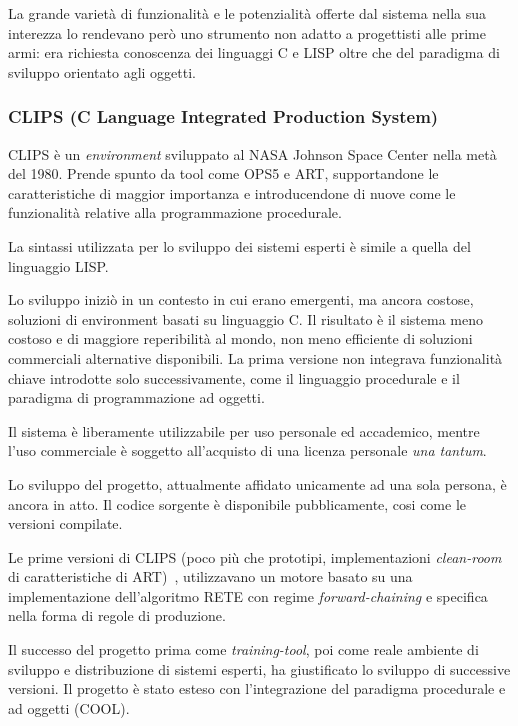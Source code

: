 La grande varietà di funzionalità e le potenzialità offerte dal sistema nella sua interezza lo rendevano però uno strumento non adatto a progettisti alle prime armi: era richiesta conoscenza dei linguaggi C e LISP oltre che del paradigma di sviluppo orientato agli oggetti.~\cite{development1993}

\subsubsection{CLIPS (C Language Integrated Production System)}

CLIPS è un \emph{environment} sviluppato al NASA Johnson Space Center nella metà del 1980. Prende spunto da tool come OPS5 e ART, supportandone le caratteristiche di maggior importanza e introducendone di nuove come le funzionalità relative alla programmazione procedurale. 

La sintassi utilizzata per lo sviluppo dei sistemi esperti è simile a quella del linguaggio LISP. 

Lo sviluppo iniziò in un contesto in cui erano emergenti, ma ancora costose, soluzioni di environment basati su linguaggio C. Il risultato è il sistema meno costoso e di maggiore reperibilità al mondo, non meno efficiente di soluzioni commerciali alternative disponibili. La prima versione non integrava funzionalità chiave introdotte solo successivamente, come il linguaggio procedurale e il paradigma di programmazione ad oggetti.~\cite{jackson1999}

Il sistema è liberamente utilizzabile per uso personale ed accademico, mentre l'uso commerciale è soggetto all'acquisto di una licenza personale \emph{una tantum}.

Lo sviluppo del progetto, attualmente affidato unicamente ad una sola persona, è ancora in atto. Il codice sorgente è disponibile pubblicamente, cosi come le versioni compilate.

Le prime versioni di CLIPS (poco più che prototipi, implementazioni \emph{clean-room} di caratteristiche di ART)~\cite{clipsarch1992}, utilizzavano un motore basato su una implementazione dell'algoritmo RETE con regime \emph{forward-chaining} e specifica nella forma di regole di produzione. 

Il successo del progetto prima come \emph{training-tool}, poi come reale ambiente di sviluppo e distribuzione di sistemi esperti, ha giustificato lo sviluppo di successive versioni. Il progetto è stato esteso con l'integrazione del paradigma procedurale e ad oggetti (COOL).

